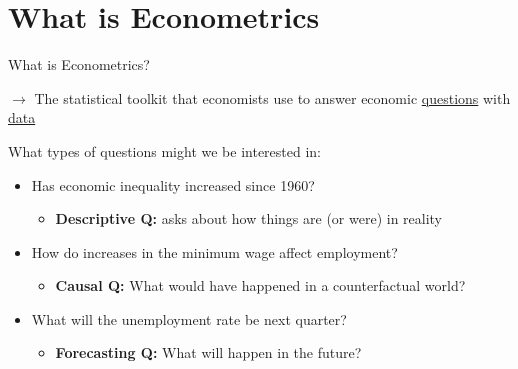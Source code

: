 \documentclass[11pt,english,handout]{beamer}
\begin{document}
\section{What is Econometrics}
\begin{frame}{What is Econometrics?}

\vspace{0.2cm}
$\rightarrow$ The statistical toolkit that economists use to answer economic \uline{questions} with \uline{data}
\bigskip 

What types of questions might we be interested in: 
\pause
\medskip

\begin{itemize}
\item<1-> Has economic inequality increased since 1960?
	\begin{itemize}
		\item<3-> \textbf{Descriptive Q:} asks about how things are (or were) in reality
	\end{itemize}
\item<1-> How do increases in the minimum wage affect employment? 
	\begin{itemize}
		\item<4-> \textbf{Causal Q:} What would have happened in a counterfactual world?  
	\end{itemize}
\item<1->   What will the unemployment rate be next quarter?
	\begin{itemize}
	\item<5-> \textbf{Forecasting Q:} What will happen in the future?  
\end{itemize}

\end{itemize}
\medskip

\pause 
{}

\end{frame}
\end{document}
